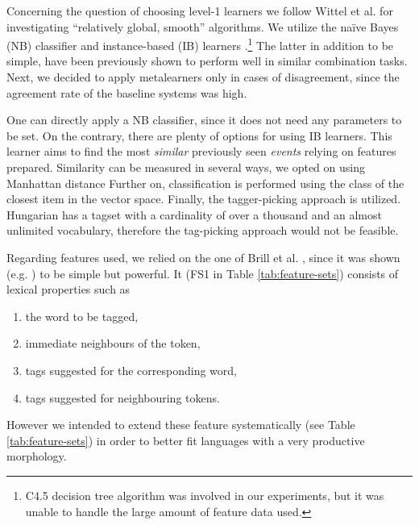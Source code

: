 Concerning the question of choosing level-1 learners we follow Wittel et al. \cite{Witten2011} for investigating ``relatively global, smooth'' algorithms. We utilize the naïve Bayes (NB) classifier and instance-based (IB) learners \cite{Aha1991}.\footnote{C4.5 decision tree algorithm was involved in our experiments, but it was unable to handle the large amount of feature data used.} The latter in addition to be simple, have been previously shown to perform well in similar combination tasks. 
Next, we decided to apply metalearners only in cases of disagreement, since the agreement rate of the baseline systems was high.

One can directly apply a NB classifier, since it does not need any parameters to be set. On the contrary, there are plenty of options for using IB learners. 
This learner aims to find the most \emph{similar} previously seen \emph{events} relying on features prepared. Similarity can be measured in several ways, we opted on using Manhattan distance  Further on, classification is performed using the class of the closest item in the vector space. Finally, the tagger-picking approach is utilized. Hungarian has a tagset with a cardinality of over a thousand and an almost unlimited vocabulary, therefore the tag-picking approach would not be feasible.

Regarding features used, we relied on the one of Brill et al. \cite{Brill1998}, since it was shown (e.g. \cite{Halteren2001}) to be simple but powerful. 
It (FS1 in Table \ref{tab:feature-sets}) consists of lexical properties such as
\begin{enumerate}
 \item the word to be tagged, 
 \item immediate neighbours of the token,
 \item tags suggested for the corresponding word,
 \item tags suggested for neighbouring tokens.
\end{enumerate}
However we intended to extend these feature systematically (see Table \ref{tab:feature-sets}) in order to better fit languages with a very productive morphology.

